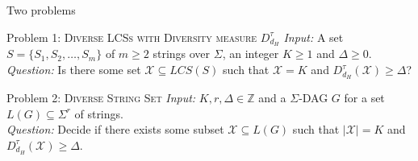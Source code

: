 \documentclass{beamer}
\begin{document}
\begin{frame}{Two problems}

    \begin{alertblock}{Problem 1: \textsc{Diverse LCSs with Diversity measure} $D_{d_H}^{\tau}$}
        \emph{Input:} A set $S = \{S_1, S_2, \ldots, S_m\}$ of $m \geq 2$ strings over $\Sigma$, an integer $K \geq 1$ and $\Delta \geq 0$. \\
        \emph{Question:} Is there some set $\mathcal{X} \subseteq LCS(S)$ such that $\mathcal{X}= K$ and $D_{d_H}^{\tau}(\mathcal{X}) \geq \Delta$?
    \end{alertblock}
    \begin{alertblock}{Problem 2: \textsc{Diverse String Set}}
        \emph{Input:} $K, r, \Delta \in \mathbb{Z}$ and a $\Sigma$-DAG $G$ for a set $L(G) \subseteq \Sigma^r$ of strings. \\
        \emph{Question:} Decide if there exists some subset $\mathcal{X} \subseteq L(G)$ such that $|\mathcal{X}| = K$ and $D_{d_H}^{\tau}(\mathcal{X}) \geq \Delta$.
    \end{alertblock}

\end{frame}
\end{document}
